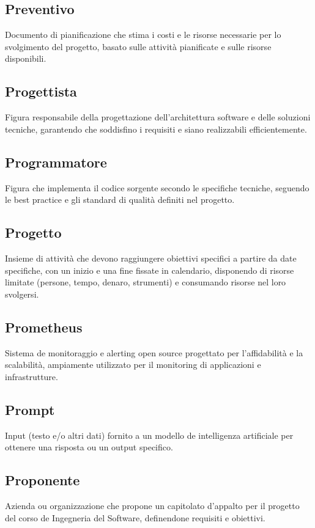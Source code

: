 \documentclass[a4paper,11pt]{article}
\begin{document}
\subsection{Preventivo}
Documento di pianificazione che stima i costi e le risorse necessarie per lo svolgimento del progetto, basato sulle attività pianificate e sulle risorse disponibili.

\subsection{Progettista}
Figura responsabile della progettazione dell'architettura software e delle soluzioni tecniche, garantendo che soddisfino i requisiti e siano realizzabili efficientemente.

\subsection{Programmatore}
Figura che implementa il codice sorgente secondo le specifiche tecniche, seguendo le best practice e gli standard di qualità definiti nel progetto.

\subsection{Progetto}
Insieme di attività che devono raggiungere obiettivi specifici a partire da date specifiche, con un inizio e una fine fissate in calendario, disponendo di risorse limitate (persone, tempo, denaro, strumenti) e consumando risorse nel loro svolgersi.

\subsection{Prometheus}
Sistema de monitoraggio e alerting open source progettato per l'affidabilità e la scalabilità, ampiamente utilizzato per il monitoring di applicazioni e infrastrutture.

\subsection{Prompt}
Input (testo e/o altri dati) fornito a un modello de intelligenza artificiale per ottenere una risposta ou un output specifico.

\subsection{Proponente}
Azienda ou organizzazione che propone un capitolato d'appalto per il progetto del corso de Ingegneria del Software, definendone requisiti e obiettivi.
\end{document}
